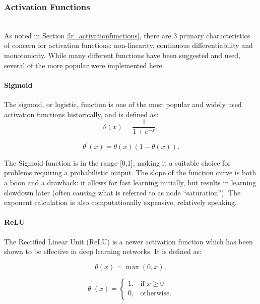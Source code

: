 \documentclass[a4paper,11pt,oneside]{article}
\theoremstyle{plain}
\theoremstyle{definition}
\begin{document}
	\subsubsection{Activation Functions}\label{imp_activation_functions}
	~\\
	As noted in Section \ref{lr_activationfunctions}, there are 3 primary characteristics of concern for activation functions: non-linearity, continuous differentiability and monotonicity. While many different functions have been suggested and used, several of the more popular were implemented here.
	
	\paragraph{Sigmoid}
	
	The sigmoid, or logistic, function is one of the most popular and widely used activation functions historically, and is defined as:
	\begin{equation}\label{func_sigmoid}
	\theta(x) = \frac{1}{1 + e^{-x}}, 
	\end{equation}
	
	\begin{equation}\label{func_sigmoidprime}
	\theta^\prime(x) = \theta(x)(1-\theta(x)).
	\end{equation}
	
	The Sigmoid function is in the range [0,1], making it a suitable choice for problems requiring a probabilistic output. The slope of the function curve is both a boon and a drawback: it allows for fast learning initially, but results in learning slowdown later (often causing what is referred to as node ``saturation''). The exponent calculation is also computationally expensive, relatively speaking.
	
	\paragraph{ReLU}
	
	The Rectified Linear Unit (ReLU) is a newer activation function which has been shown to be effective in deep learning networks. It is defined as:
	
	\begin{equation}\label{func_relu}
	\theta(x) = \max(0, x), 
	\end{equation}
	
	\begin{equation}\end{equation}\label{func_relu_prime}
	\[
	\theta^\prime(x)= 
	\begin{cases}
	1,& \text{if } x\geq 0\\
	0,              & \text{otherwise.}
	\end{cases}
	\]
	
\end{document}
